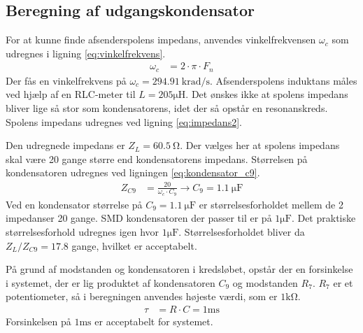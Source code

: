 \subsection{Beregning af udgangskondensator}
For at kunne finde afsenderspolens impedans, anvendes vinkelfrekvensen $\omega_c$ som udregnes i ligning \ref{eq:vinkelfrekvens}.
\begin{align}
	\omega_c & = 2 \cdot \pi \cdot F_n \label{eq:vinkelfrekvens}
\end{align}
Der fås en vinkelfrekvens på $\omega_c = \SI{294.91}{\kilo\radian\per\second}$.
Afsenderspolens induktans måles ved hjælp af en RLC-meter til $L = 205\si{\micro \henry}$.
Det ønskes ikke at spolens impedans bliver lige så stor som kondensatorens, idet der så opstår en resonanskreds. 
Spolens impedans udregnes ved ligning \ref{eq:impedans2}.

Den udregnede impedans er $Z_L = \SI{60.5}{\ohm}$.
Der vælges her at spolens impedans skal være 20 gange større end kondensatorens impedans. Størrelsen på kondensatoren udregnes ved ligningen \ref{eq:kondensator_c9}.
\begin{align}
	Z_{C9} & = \frac{20}{\omega_c \cdot C_9} \rightarrow C_9 = \SI{1.1}{\micro\farad} \label{eq:kondensator_c9}
\end{align}
Ved en kondensator størrelse på $C_9 = \SI{1.1}{\micro\farad}$ er størrelsesforholdet mellem de 2 impedanser 20 gange. 
SMD kondensatoren der passer til er på $ 1\si{\micro\farad}$. Det praktiske størrelsesforhold udregnes igen hvor $ 1\si{\micro\farad}$. Størrelsesforholdet bliver da $\si{Z_L \per Z_{C9}} = \num{17.8}$ gange, hvilket er acceptabelt.

På grund af modstanden og kondensatoren i kredsløbet, opstår der en forsinkelse i systemet, der er lig produktet af kondensatoren $C_9$ og modstanden $R_7$. $R_7$ er et potentiometer, så i beregningen anvendes højeste værdi, som er $1\si{\kilo\ohm}$.
\begin{align}
	\tau & = R \cdot C = 1 \si{\milli\second}
\end{align}
Forsinkelsen på $1 \si{\milli\second}$ er acceptabelt for systemet.

